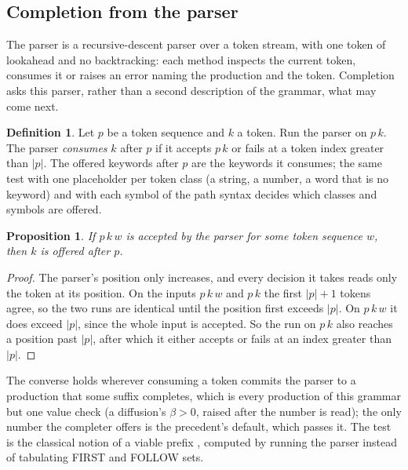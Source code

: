 \documentclass[11pt]{article}
\theoremstyle{plain}
\newtheorem{proposition}{Proposition}
\theoremstyle{definition}
\newtheorem{definition}{Definition}
\theoremstyle{remark}
\begin{document}
\subsection{Completion from the parser}
The parser is a recursive-descent parser \cite{wirth1996compiler} over a token stream, with one
token of lookahead and no backtracking: each method inspects the current token, consumes it or
raises an error naming the production and the token. Completion asks this parser, rather than a
second description of the grammar, what may come next.

\begin{definition}
Let $p$ be a token sequence and $k$ a token. Run the parser on $p\,k$. The parser \emph{consumes}
$k$ after $p$ if it accepts $p\,k$ or fails at a token index greater than $|p|$. The offered
keywords after $p$ are the keywords it consumes; the same test with one placeholder per token
class (a string, a number, a word that is no keyword) and with each symbol of the path syntax
decides which classes and symbols are offered.
\end{definition}

\begin{proposition}\label{prop:complete}
If $p\,k\,w$ is accepted by the parser for some token sequence $w$, then $k$ is offered after $p$.
\end{proposition}
\begin{proof}
The parser's position only increases, and every decision it takes reads only the token at its
position. On the inputs $p\,k\,w$ and $p\,k$ the first $|p|+1$ tokens agree, so the two runs are
identical until the position first exceeds $|p|$. On $p\,k\,w$ it does exceed $|p|$, since the
whole input is accepted. So the run on $p\,k$ also reaches a position past $|p|$, after which it
either accepts or fails at an index greater than $|p|$.
\end{proof}

The converse holds wherever consuming a token commits the parser to a production that some
suffix completes, which is every production of this grammar but one value check (a diffusion's
$\beta > 0$, raised after the number is read); the only number the completer offers is the
precedent's default, which passes it. The test is the classical notion of a viable prefix \cite{aho2006compilers},
computed by running the parser instead of tabulating FIRST and FOLLOW sets.
\end{document}
